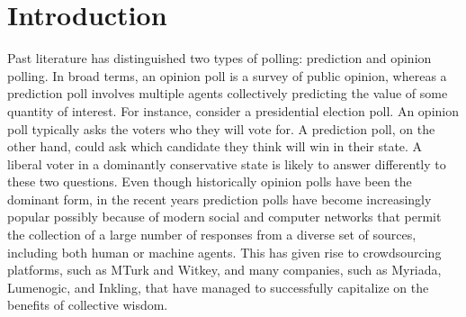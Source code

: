 \documentclass[11pt]{article}
\theoremstyle{definition}
\theoremstyle{definition}
\begin{document}


\section{Introduction}
Past literature has distinguished two types of polling: prediction and opinion polling. In broad terms, an opinion poll is a survey of public opinion, whereas a prediction poll involves multiple agents collectively predicting the value of some quantity of interest. For instance, consider a presidential election poll. An opinion poll typically asks the voters who they will vote for. A prediction poll, on the other hand, could ask which candidate they think will win in their state. A liberal voter in a dominantly conservative state is likely to answer differently to these two questions. 
Even though historically opinion polls have been the dominant form, in the recent years prediction polls have become increasingly popular possibly because of modern social and computer networks  that permit the collection of a large number of responses from a diverse set of sources, including both human or machine agents. This has given rise to crowdsourcing platforms, such as MTurk and Witkey, and many companies, such as Myriada, Lumenogic, and Inkling, that have managed to successfully  capitalize on the benefits of collective wisdom. 





% 
%
% 
\end{document}
